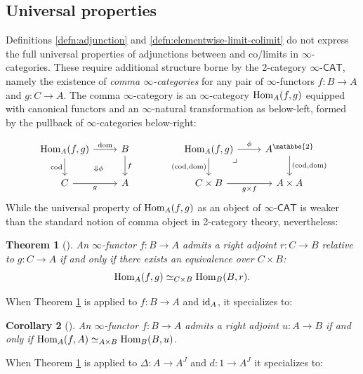 \documentclass[11pt]{ctexart}
\newtheorem{thm}{Theorem}[section]
\newtheorem{cor}[thm]{Corollary}
\theoremstyle{definition}
\theoremstyle{remark}
\numberwithin{equation}{section}
\newcommand{\id}{\textup{id}}
\newcommand{\dom}{\textup{dom}}
\newcommand{\cod}{\textup{cod}}
\newcommand{\Hom}{\textup{Hom}}
\newcommand{\ooCAT}{\infty\text{-}\mathsf{CAT}}
\newcommand{\1}{\mathbbe{1}}
\newcommand{\2}{\mathbbe{2}}
\newcommand{\3}{\mathbbe{3}}
\begin{document}
\subsection*{Universal properties}

Definitions \ref{defn:adjunction} and \ref{defn:elementwise-limit-colimit} do not express the full universal properties of adjunctions between and co/limits in $\infty$-categories. These require additional structure borne by the 2-category $\ooCAT$, namely the existence of \emph{comma $\infty$-categories} for any pair of $\infty$-functors $f \colon B \to A$ and $g \colon C \to A$. The comma $\infty$-category is an $\infty$-category $\Hom_A(f,g)$ equipped with canonical functors and an $\infty$-natural transformation as below-left, formed by the pullback of $\infty$-categories below-right:

\begin{equation}\label{eq:comma-cat}
    \begin{tikzcd}
        \Hom_A(f,g) \arrow[r, "\dom"] \arrow[d, "\cod"'] \arrow[dr, phantom, "\scriptstyle\Downarrow\phi"] & B \arrow[d, "f"]  & & \Hom_A(f,g) \arrow[dr, phantom, "\lrcorner" very near start]\arrow[r, "\phi"] \arrow[d, "{(\cod,\dom)}"'] & A^\2 \arrow[d, "{(\cod,\dom)}"] \\ C \arrow[r, "g"'] & A & & C \times B \arrow[r, "g \times f"'] & A \times A
    \end{tikzcd}
\end{equation}
While the universal property of $\Hom_A(f,g)$ as an object of $\ooCAT$ is weaker than the standard notion of comma object in 2-category theory, nevertheless:

\begin{thm}[{\cite[3.5.8]{RV}}]\label{thm:commas} An $\infty$-functor $f \colon B \to A$ admits a right adjoint $r \colon C \to B$  relative to $g \colon C \to A$ if and only if there exists an equivalence over $C \times B$:
    \[ \Hom_A(f,g) \simeq_{C \times B} \Hom_B(B,r). \]
\end{thm}

When Theorem \ref{thm:commas} is applied to $f \colon B \to A$ and $\id_A$, it specializes to:

\begin{cor}[{\cite[4.1.1]{RV}}] An $\infty$-functor $f \colon B \to A$ admits a right adjoint $u \colon A \to B$ if and only if $\Hom_A(f,A) \simeq_{A \times B} \Hom_B(B,u)$.
\end{cor}

When Theorem \ref{thm:commas} is applied to $\Delta \colon A \to A^J$ and $d \colon 1 \to A^J$ it specializes to:
\end{document}
